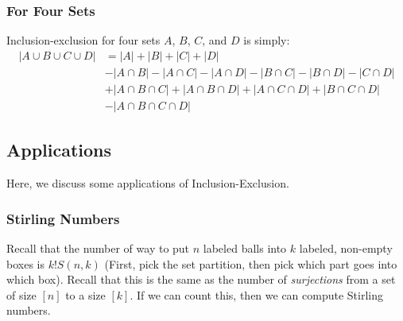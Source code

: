 \documentclass[letterpaper]{article}
\begin{document}
\subsubsection{For Four Sets}
Inclusion-exclusion for four sets $A$, $B$, $C$, and $D$ is simply:
\begin{equation*}
    \begin{aligned}
        |A \cup B \cup C \cup D| &= |A| + |B| + |C| + |D| \\ 
            &- |A \cap B| - |A \cap C| - |A \cap D| - |B \cap C| - |B \cap D| - |C \cap D| \\ 
            &+ |A \cap B \cap C| + |A \cap B \cap D| + |A \cap C \cap D| + |B \cap C \cap D| \\
            &- |A \cap B \cap C \cap D|
    \end{aligned}
\end{equation*}


\subsection{Applications}
Here, we discuss some applications of Inclusion-Exclusion.

\subsubsection{Stirling Numbers}
Recall that the number of way to put $n$ labeled balls into $k$ labeled, non-empty boxes is $k!S(n, k)$ (First, pick the set partition, then pick which part goes into which box). Recall that this is the same as the number of \emph{surjections} from a set of size $[n]$ to a size $[k]$. If we can count this, then we can compute Stirling numbers. 

\bigskip 
\end{document}
